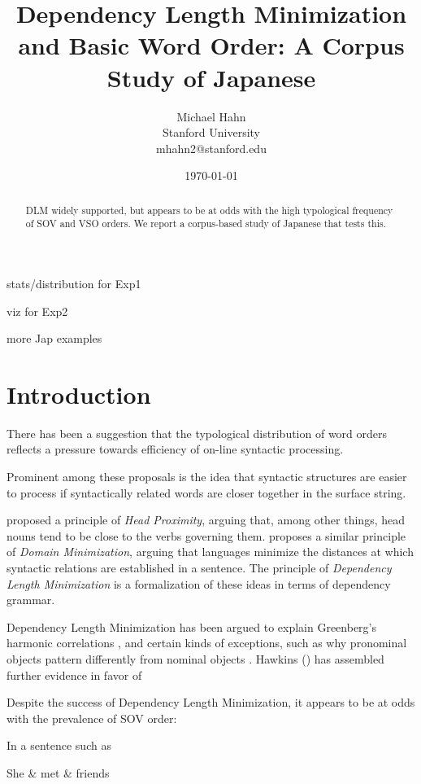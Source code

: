 \documentclass[11pt,a4paper]{article}
\title{Dependency Length Minimization and Basic Word Order: A Corpus Study of Japanese}
\author{Michael Hahn \\ Stanford University \\ mhahn2@stanford.edu}
\date{\today}
\begin{document}
\maketitle
\begin{abstract}
DLM widely supported, but appears to be at odds with the high typological frequency of SOV and VSO orders.
We report a corpus-based study of Japanese that tests this.
\end{abstract}

{\color{red} stats/distribution for Exp1}

{\color{red} viz for Exp2}

{\color{red} more Jap examples}

\section{Introduction}

There has been a suggestion that the typological distribution of word orders reflects a pressure towards efficiency of on-line syntactic processing.

Prominent among these proposals is the idea that syntactic structures are easier to process if syntactically related words are closer together in the surface string.

\cite{rijkhoff-word-1986} proposed a principle of \emph{Head Proximity}, arguing that, among other things, head nouns tend to be close to the verbs governing them.
\cite{hawkins2014crosslinguistic} proposes a similar principle of \emph{Domain Minimization}, arguing that languages minimize the distances at which syntactic relations are established in a sentence.
The principle of \emph{Dependency Length Minimization} \citep{temperley2018minimizing} is a formalization of these ideas in terms of dependency grammar.

Dependency Length Minimization has been argued to explain Greenberg's harmonic correlations \citep{rijkhoff-word-1986, hawkins1994performance}, and certain kinds of exceptions, such as why pronominal objects pattern differently from nominal objects \citep{dryer1992greenbergian}.
Hawkins (\citep{hawkins2004efficiency, hawkins2007processing, hawkins2014crosslinguistic}) has assembled further evidence in favor of 

Despite the success of Dependency Length Minimization, it appears to be at odds with the prevalence of SOV order:

In a sentence such as

\begin{centering}
\begin{dependency}[theme = simple]
   \begin{deptext}[column sep=1em]
          She \& met \& friends  \\
   \end{deptext}
\end{dependency}
\end{centering}
\end{document}
